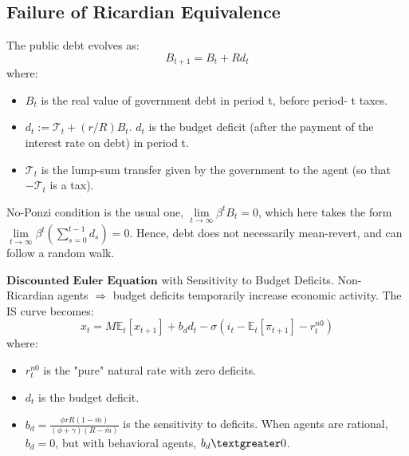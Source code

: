 \documentclass{beamer}
\begin{document}
\begin{frame}
    \tableofcontents[currentsection, hideothersubsections, sections=\value{section}]
\end{frame}

\subsection{Failure of Ricardian Equivalence}

\begin{frame}{\subsecname}
    The public debt evolves as:
    \begin{equation}\tag{43}
        B_{t+1}=B_{t}+R d_{t}
    \end{equation}
    where:
    \begin{itemize}
        \item $B_{t}$ is the real value of government debt in period t, before period- t taxes.
        \item $d_{t}:=\mathcal{T}_{t}+(r/R)B_{t}$. $d_{t}$ is the budget deficit (after the payment of the interest rate on debt) in period t.
        \item $\mathcal{T}_{t}$ is the lump-sum transfer given by the government to the agent (so that $-\mathcal{T}_{t}$ is a tax).
    \end{itemize}
    No-Ponzi condition is the usual one, $\lim\limits_{t\to\infty}\beta^{t}B_{t}=0$, which here takes the form $\lim\limits_{t\to\infty}\beta^{t}\left(\sum_{s=0}^{t-1}d_{s}\right)=0$. Hence, debt does not necessarily mean-revert, and can follow a random walk.
\end{frame}

\begin{frame}{\subsecname}
    $\textbf{Discounted Euler Equation}$ with Sensitivity to Budget Deficits. Non-Ricardian agents $\Rightarrow$ budget deficits temporarily increase economic activity. The IS curve becomes:
    \begin{equation}\tag{44}            x_{t}=M\mathbb{E}_{t}\left[x_{t+1}\right]+b_{d}d_{t}-\sigma\left(i_{t}-\mathbb{E}_{t}\left[\pi_{t+1}\right]-r_{t}^{n0}\right)
    \end{equation}
    where:
    \begin{itemize}
        \item $r_{t}^{n0}$ is the "pure" natural rate with zero deficits.
        \item $d_{t}$ is the budget deficit.
        \item $b_{d}=\frac{\phi rR(1-\overline{m})}{(\phi+\gamma)(R-\overline{m})}$ is the sensitivity to deficits. When agents are rational, $b_{d}=0$, but with behavioral agents, $b_{d}\textgreater0$.
    \end{itemize}
\end{frame}
\end{document}
